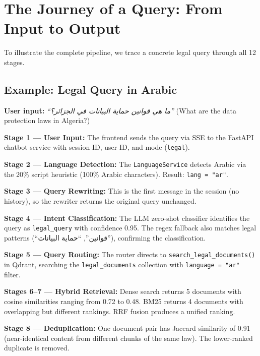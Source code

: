\documentclass[12pt, a4paper]{article}
\begin{document}
\section{The Journey of a Query: From Input to Output}

To illustrate the complete pipeline, we trace a concrete legal query through
all 12 stages.

\subsection{Example: Legal Query in Arabic}

\textbf{User input:} \textit{``ما هي قوانين حماية البيانات في الجزائر؟''}
(What are the data protection laws in Algeria?)

\textbf{Stage 1 --- User Input:} The frontend sends the query via SSE to the
FastAPI chatbot service with session ID, user ID, and mode (\texttt{legal}).

\textbf{Stage 2 --- Language Detection:} The \texttt{LanguageService} detects
Arabic via the 20\% script heuristic (100\% Arabic characters).
Result: \texttt{lang = "ar"}.

\textbf{Stage 3 --- Query Rewriting:} This is the first message in the session
(no history), so the rewriter returns the original query unchanged.

\textbf{Stage 4 --- Intent Classification:} The LLM zero-shot classifier
identifies the query as \texttt{legal\_query} with confidence 0.95. The
regex fallback also matches legal patterns (``قوانين'', ``حماية البيانات''),
confirming the classification.

\textbf{Stage 5 --- Query Routing:} The router directs to
\texttt{search\_legal\_documents()} in Qdrant, searching the
\texttt{legal\_documents} collection with \texttt{language = "ar"} filter.

\textbf{Stages 6--7 --- Hybrid Retrieval:} Dense search returns 5 documents
with cosine similarities ranging from 0.72 to 0.48. BM25 returns 4 documents
with overlapping but different rankings. RRF fusion produces a unified ranking.

\textbf{Stage 8 --- Deduplication:} One document pair has Jaccard similarity
of 0.91 (near-identical content from different chunks of the same law).
The lower-ranked duplicate is removed.
\end{document}
